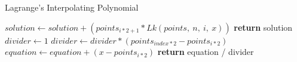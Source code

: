\documentclass{article}
\begin{document}
  \begin{algorithm}
    \caption{Lagrange's Interpolating Polynomial}
    \begin{algorithmic}[1]
          \State $solution \gets solution +
            (points_{i * 2 + 1} * Lk(points,\ n,\ i,\ x))$
        \EndFor
        \State \textbf{return} solution
      \EndProcedure
        \State $divider \gets 1$
            \State $divider \gets divider * (points_{index * 2} - points_{i * 2})$
            \State $equation \gets equation + (x - points_{i * 2})$
          \EndIf
        \EndFor
        \State \textbf{return} equation / divider
      \EndProcedure
    \end{algorithmic}
  \end{algorithm}
\end{document}
